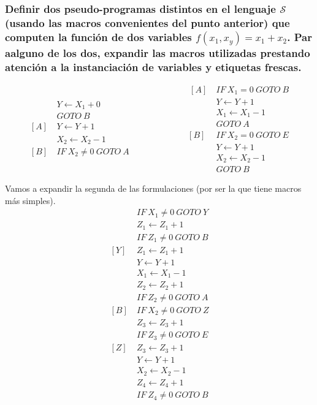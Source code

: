 \documentclass[fleqn, 11pt]{article}
\newcommand{\Scur}{\mathcal{S}}
\newcommand{\into}{\leftarrow}
\begin{document}
\subsubsection{Definir dos pseudo-programas distintos en el lenguaje $\Scur$
(usando las macros convenientes del punto anterior) que computen la función de
dos variables $f(x_1, x_y) = x_1 + x_2$. Par aalguno de los dos, expandir las
macros utilizadas prestando atención a la instanciación de variables y
etiquetas frescas.}

\[
	\begin{aligned}
		     &Y   \into X_1 + 0 \\
		     &GOTO\ B \\
		[A]\ &Y   \into Y   + 1 \\
		     &X_2 \into X_2 - 1 \\
		[B]\ &IF\ X_2 \neq 0\ GOTO\ A
	\end{aligned}
	\hspace{6em}
	\begin{aligned}\
		[A]\ &IF\ X_1 = 0\ GOTO\ B \\
		     &Y   \into Y   + 1 \\
		     &X_1 \into X_1 - 1 \\
		     &GOTO\ A \\
		[B]\ &IF\ X_2 = 0\ GOTO\ E \\
		     &Y   \into Y   + 1 \\
		     &X_2 \into X_2 - 1 \\
		     &GOTO\ B
	\end{aligned}
\]

Vamos a expandir la segunda de las formulaciones (por ser la que tiene macros
más simples).
\begin{align*}
	[A]\ &IF\ X_1 \neq 0\ GOTO\ Y \\
	     &Z_1 \into Z_1 + 1 \\
	     &IF\ Z_1 \neq 0\ GOTO\ B \\
	[Y]\ &Z_1 \into Z_1 + 1 \\
	     &Y   \into Y   + 1 \\
	     &X_1 \into X_1 - 1 \\
	     &Z_2 \into Z_2 + 1 \\
	     &IF\ Z_2 \neq 0\ GOTO\ A \\
	[B]\ &IF\ X_2 \neq 0\ GOTO\ Z \\
	     &Z_3 \into Z_3 + 1 \\
	     &IF\ Z_3 \neq 0\ GOTO\ E \\
	[Z]\ &Z_3 \into Z_3 + 1 \\
	     &Y   \into Y   + 1 \\
	     &X_2 \into X_2 - 1 \\
	     &Z_4 \into Z_4 + 1 \\
	     &IF\ Z_4 \neq 0\ GOTO\ B \\
\end{align*}
\end{document}
